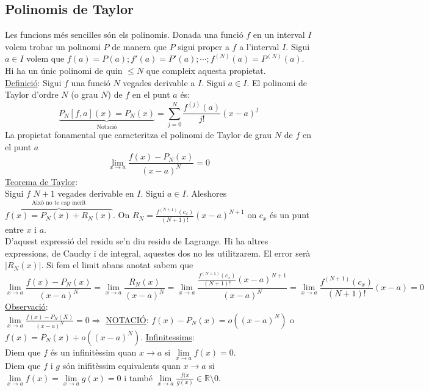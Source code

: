 \subsection{Polinomis de Taylor}
Les funcions més sencilles són els polinomis. Donada una funció $f$ en un interval $I$ volem trobar un polinomi $P$ de manera que $P$ sigui proper a $f$ a l'interval $I$. Sigui $a \in I$ volem que $f(a) = P(a); f'(a) = P'(a); \dotsb; f^{(N)}(a) = P^{(N)}(a)$. Hi ha un únic polinomi de quin $\leq N$ que compleix aquesta propietat.\\
\underline{Definició}: Sigui $f$ una funció $N$ vegades derivable a $I$. Sigui $a \in I$. El polinomi de Taylor d'ordre $N$ (o grau $N$) de $f$ en el punt $a$ és:
\begin{displaymath}
    \underbrace{P_N[f, a](x) = P_N(x)}_\text{Notació} = \sum\limits_{j = 0}^N \frac{f^{(j)}(a)}{j!}(x-a)^j
\end{displaymath}
La propietat fonamental que caracteritza el polinomi de Taylor de grau $N$ de $f$ en el punt $a$
\begin{displaymath}
    \lim_{x \rightarrow a}\frac{f(x)-P_N(x)}{(x-a)^N} = 0
\end{displaymath}
\underline{Teorema de Taylor}:\\
Sigui $f$ $N+1$ vegades derivable en $I$. Sigui $a \in I$. Aleshores $\overbrace{f(x) = P_N(x) + R_N(x)}^\text{Això no te cap merit}$. On $R_N = \frac{f^{(N+1)}(c_x)}{(N+1)!}(x-a)^{N+1}$ on $c_x$ és un punt entre $x$ i $a$.\\
D'aquest expressió del residu se'n diu residu de Lagrange. Hi ha altres expressions, de Cauchy i de integral, aquestes dos no les utilitzarem. El error serà $|R_N(x)|$. Si fem el limit abans anotat sabem que
\begin{displaymath}
    \lim_{x \rightarrow a}\frac{f(x)-P_N(x)}{(x-a)^N} = \lim_{x \rightarrow a}\frac{R_N(x)}{(x-a)^N} = \lim_{x \rightarrow a}\frac{\frac{f^{(N+1)}(c_x)}{(N+1)!}(x-a)^{N+1}}{(x-a)^N} = \lim_{x \rightarrow a} \frac{f^{(N+1)}(c_x)}{(N+1)!}(x-a) = 0
\end{displaymath}
\underline{Observació}:\\
$\lim\limits_{x \rightarrow a} \frac{f(x)-P_N(X)}{(x-a)^N} = 0 \Rightarrow$ \underline{NOTACIÓ}: $f(x) - P_N(x) = o((x-a)^N)$ o $f(x) = P_N(x) + o((x-a)^N)$.
\underline{Infinitessims}:\\
Diem que $f$ és un infinitèssim quan $x \rightarrow a$ si $\lim\limits_{x \rightarrow a} f(x) = 0$.\\
Diem que $f$ i $g$ són inifitèssim equivalents quan $x \rightarrow a$ si $\lim\limits_{x \rightarrow a} f(x) = \lim\limits_{x \rightarrow a} g(x) = 0$ i també $\lim\limits_{x \rightarrow a} \frac{f(x}{g(x)} \in \mathbb{R} \setminus 0$.
